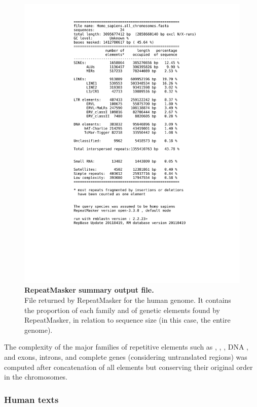 \begin{figure}[!ht]
  \includegraphics[width=\textwidth,trim=1.5cm 4cm 1.5cm 2cm]{tex_source/Appendix/all_tbl.pdf}
  \caption[RepeatMasker summary output file]{
    \textbf{RepeatMasker summary output file.}\\
    File returned by RepeatMasker for the human genome. It contains the proportion of each family and  of genetic elements found by RepeatMasker, in relation to sequence size (in this case, the entire genome).
  }
  \label{fig:repe-summ-outp}
\end{figure}

The complexity of the major families of repetitive elements such as , , , DNA ,  and exons, introns, and complete genes (considering untranslated regions) was computed after concatenation of all elements but conserving their original order in the chromosomes.

\subsubsection{Human texts}
\label{sec:human-texts}

